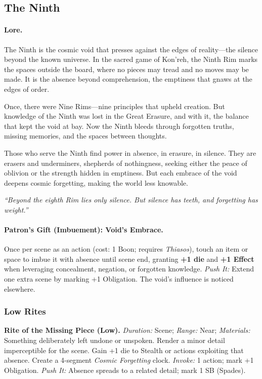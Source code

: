 \subsection{The Ninth}
\label{patron:ninth}

\paragraph{Lore.}
The Ninth is the cosmic void that presses against the edges of reality—the silence beyond the known universe. In the sacred game of Kon'reh, the Ninth Rim marks the spaces outside the board, where no pieces may tread and no moves may be made. It is the absence beyond comprehension, the emptiness that gnaws at the edges of order.

Once, there were Nine Rims—nine principles that upheld creation. But knowledge of the Ninth was lost in the Great Erasure, and with it, the balance that kept the void at bay. Now the Ninth bleeds through forgotten truths, missing memories, and the spaces between thoughts.

Those who serve the Ninth find power in absence, in erasure, in silence. They are erasers and underminers, shepherds of nothingness, seeking either the peace of oblivion or the strength hidden in emptiness. But each embrace of the void deepens cosmic forgetting, making the world less knowable.  

\emph{``Beyond the eighth Rim lies only silence. But silence has teeth, and forgetting has weight.''}

\paragraph{Patron's Gift (Imbuement): Void's Embrace.}
Once per scene as an action (cost: 1 Boon; requires \emph{Thiasos}), touch an item or space to imbue it with absence until scene end, granting \textbf{+1 die} and \textbf{+1 Effect} when leveraging concealment, negation, or forgotten knowledge.  
\emph{Push It:} Extend one extra scene by marking +1 Obligation. The void’s influence is noticed elsewhere.

\subsubsection*{Low Rites}

\textbf{Rite of the Missing Piece (Low).}  
\emph{Duration:} Scene; \emph{Range:} Near; \emph{Materials:} Something deliberately left undone or unspoken.  
Render a minor detail imperceptible for the scene. Gain +1 die to Stealth or actions exploiting that absence. Create a 4-segment \emph{Cosmic Forgetting} clock.  
\emph{Invoke:} 1 action; mark +1 Obligation.  
\emph{Push It:} Absence spreads to a related detail; mark 1 SB (Spades).


